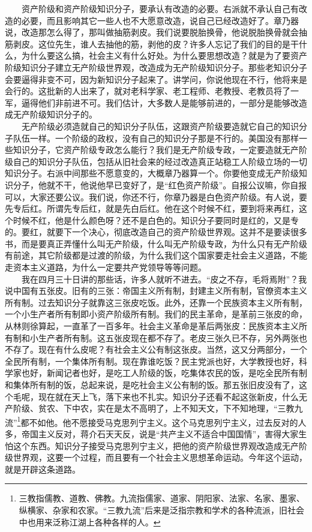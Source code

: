 \documentclass[cn,11pt,chinese]{elegantbook}
\begin{document}
　　资产阶级和资产阶级知识分子，要承认有改造的必要。右派就不承认自己有改造的必要，而且影响其它一些人也不大愿意改造，说自己已经改造好了。章乃器说，改造那怎么得了，那叫做抽筋剥皮。我们说要脱胎换骨，他说脱胎换骨就会抽筋剥皮。这位先生，谁人去抽他的筋，剥他的皮？许多人忘记了我们的目的是干什么，为什么要这么搞，社会主义有什么好处。为什么要思想改造？就是为了要资产阶级知识分子建立无产阶级世界观，改造成为无产阶级知识分子。那些老知识分子会要逼得非变不可，因为新知识分子起来了。讲学问，你说他现在不行，他将来是会行的。这批新的人出来了，就对老科学家、老工程师、老教授、老教员将了一军，逼得他们非前进不可。我们估计，大多数人是能够前进的，一部分是能够改造成无产阶级知识分子的。\\
　　无产阶级必须造就自己的知识分子队伍，这跟资产阶级要造就它自己的知识分子队伍一样。一个阶级的政权，没有自己的知识分子那是不行的。美国没有那样一些知识分子，它资产阶级专政怎么能行？我们是无产阶级专政，一定要造就无产阶级自己的知识分子队伍，包括从旧社会来的经过改造真正站稳工人阶级立场的一切知识分子。右派中间那些不愿意变的，大概章乃器算一个。你要他变成无产阶级知识分子，他就不干，他说他早已变好了，是“红色资产阶级”。自报公议嘛，你自报可以，大家还要公议。我们说，你还不行，你章乃器是白色资产阶级。有人说，要先专后红。所谓先专后红，就是先白后红。他在这个时候不红，要到将来再红，这个时候不红，他是什么颜色呀？还不是白色的。知识分子要同时是红的，又是专的。要红，就要下一个决心，彻底改造自己的资产阶级世界观。这并不是要读很多书，而是要真正弄懂什么叫无产阶级，什么叫无产阶级专政，为什么只有无产阶级有前途，其它阶级都是过渡的阶级，为什么我们这个国家要走社会主义道路，不能走资本主义道路，为什么一定要共产党领导等等问题。\\
　　我在四月三十日讲的那些话，许多人就听不进去。“皮之不存，毛将焉附”？我说中国有五张皮。旧有的三张：帝国主义所有制，封建主义所有制，官僚资本主义所有制。过去知识分子就靠这三张皮吃饭。此外，还靠一个民族资本主义所有制，一个小生产者所有制即小资产阶级所有制。我们的民主革命，是革前三张皮的命，从林则徐算起，一直革了一百多年。社会主义革命是革后两张皮：民族资本主义所有制和小生产者所有制。这五张皮现在都不存了。老皮三张久已不存，另外两张也不存了。现在有什么皮呢？有社会主义公有制这张皮。当然，这又分两部分，一个全民所有制，一个集体所有制。现在靠谁吃饭？民主党派也好，大学教授也好，科学家也好，新闻记者也好，是吃工人阶级的饭，吃集体农民的饭，是吃全民所有制和集体所有制的饭，总起来说，是吃社会主义公有制的饭。那五张旧皮没有了，这个毛呢，现在就在天上飞，落下来也不扎实。知识分子还看不起这张新皮，什么无产阶级、贫农、下中农，实在是太不高明了，上不知天文，下不知地理，“三教九流”\footnote[1]{ 三教指儒教、道教、佛教。九流指儒家、道家、阴阳家、法家、名家、墨家、纵横家、杂家和农家。“三教九流”后来是泛指宗教和学术的各种流派，旧社会中也用来泛称江湖上各种各样的人。}都不如他。他不愿接受马克思列宁主义。这个马克思列宁主义，过去反对的人多，帝国主义反对，蒋介石天天反，说是“共产主义不适合中国国情”，害得大家生怕这个东西。知识分子接受马克思列宁主义，把他的资产阶级世界观改造成无产阶级世界观，这要一个过程，而且要有一个社会主义思想革命运动。今年这个运动，就是开辟这条道路。\\
\end{document}
